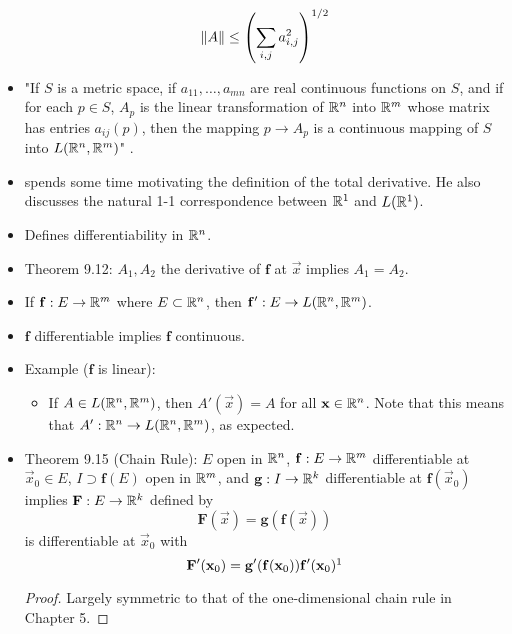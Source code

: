 \documentclass[../notes.tex]{subfiles}
\begin{document}
\begin{itemize}
    \begin{equation*}
        \norm{A} \leq \left( \sum_{i,j}a_{i,j}^2 \right)^{1/2}
    \end{equation*}
    \item "If $S$ is a metric space, if $a_{11},\dots,a_{mn}$ are real continuous functions on $S$, and if for each $p\in S$, $A_p$ is the linear transformation of $\mathbb{R}^n$ into $\mathbb{R}^m$ whose matrix has entries $a_{ij}(p)$, then the mapping $p\to A_p$ is a continuous mapping of $S$ into $L(\mathbb{R}^n,\mathbb{R}^m)$" \parencite[211]{bib:Rudin}.
    \item \textcite{bib:Rudin} spends some time motivating the definition of the total derivative. He also discusses the natural 1-1 correspondence between $\mathbb{R}^1$ and $L(\mathbb{R}^1)$.
    \item Defines differentiability in $\mathbb{R}^n$.
    \item Theorem 9.12: $A_1,A_2$ the derivative of $\mathbf{f}$ at $\vec{x}$ implies $A_1=A_2$.
    \item If $\mathbf{f}:E\to\mathbb{R}^m$ where $E\subset\mathbb{R}^n$, then $\mathbf{f}':E\to L(\mathbb{R}^n,\mathbb{R}^m)$.
    \item $\mathbf{f}$ differentiable implies $\mathbf{f}$ continuous.
    \item Example ($\mathbf{f}$ is linear):
    \begin{itemize}
        \item If $A\in L(\mathbb{R}^n,\mathbb{R}^m)$, then $A'(\vec{x})=A$ for all $\mathbf{x}\in\mathbb{R}^n$. Note that this means that $A':\mathbb{R}^n\to L(\mathbb{R}^n,\mathbb{R}^m)$, as expected.
    \end{itemize}
    \item Theorem 9.15 (Chain Rule): $E$ open in $\mathbb{R}^n$, $\mathbf{f}:E\to\mathbb{R}^m$ differentiable at $\vec{x}_0\in E$, $I\supset\mathbf{f}(E)$ open in $\mathbb{R}^m$, and $\mathbf{g}:I\to\mathbb{R}^k$ differentiable at $\mathbf{f}(\vec{x}_0)$ implies $\mathbf{F}:E\to\mathbb{R}^k$ defined by
    \begin{equation*}
        \mathbf{F}(\vec{x}) = \mathbf{g}(\mathbf{f}(\vec{x}))
    \end{equation*}
    is differentiable at $\vec{x}_0$ with
    \begin{equation*}
        \mathbf{F}'(\vec{x}_0) = \mathbf{g}'(\mathbf{f}(\vec{x}_0))\mathbf{f}'(\vec{x}_0)\footnotemark
    \end{equation*}
    \begin{proof}
        Largely symmetric to that of the one-dimensional chain rule in Chapter 5.

\end{proof}
\end{itemize}
\end{document}

